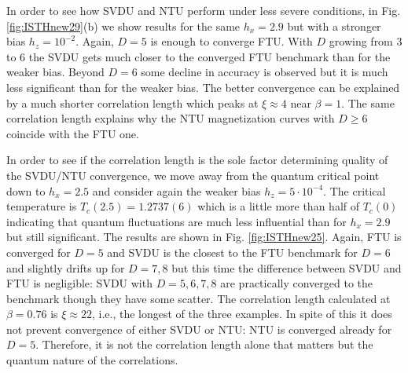 \documentclass[prb,twocolumn,showkeys,showpacs,amsmath,amsfonts,floatfix,superscriptaddress,nofootinbib]{revtex4-1}
\begin{document}
In order to see how SVDU and NTU perform under less severe conditions, in Fig. \ref{fig:ISTHnew29}(b) we show results for the same $h_x=2.9$ but with a stronger bias $h_z=10^{-2}$. Again, $D=5$ is enough to converge FTU. With $D$ growing from $3$ to $6$ the SVDU gets much closer to the converged FTU benchmark than for the weaker bias. Beyond $D=6$ some decline in accuracy is observed but it is much less significant than for the weaker bias. The better convergence can be explained by a much shorter correlation length which peaks at $\xi\approx4$ near $\beta=1$. The same correlation length explains why the NTU magnetization curves with $D\geq6$ coincide with the FTU one.

In order to see if the correlation length is the sole factor determining quality of the SVDU/NTU convergence, we move away from the quantum critical point down to $h_x=2.5$ and consider again the weaker bias $h_z=5\cdot10^{-4}$. The critical temperature is $T_c(2.5)=1.2737(6)$\cite{Hesselmann_TIsingQMC_16} which is a little more than half of $T_c(0)$ indicating that quantum fluctuations are much less influential than for $h_x=2.9$ but still significant. The results are shown in Fig. \ref{fig:ISTHnew25}. Again, FTU is converged for $D=5$ and SVDU is the closest to the FTU benchmark for $D=6$ and slightly drifts up for $D=7,8$ but this time the difference between SVDU and FTU is negligible: SVDU with $D=5,6,7,8$ are practically converged to the benchmark though they have some scatter. The correlation length calculated at $\beta=0.76$ is $\xi\approx 22$, i.e., the longest of the three examples. In spite of this it does not prevent convergence of either SVDU or NTU: NTU is converged already for $D=5$. Therefore, it is not the correlation length alone that matters but the quantum nature of the correlations.
\end{document}
